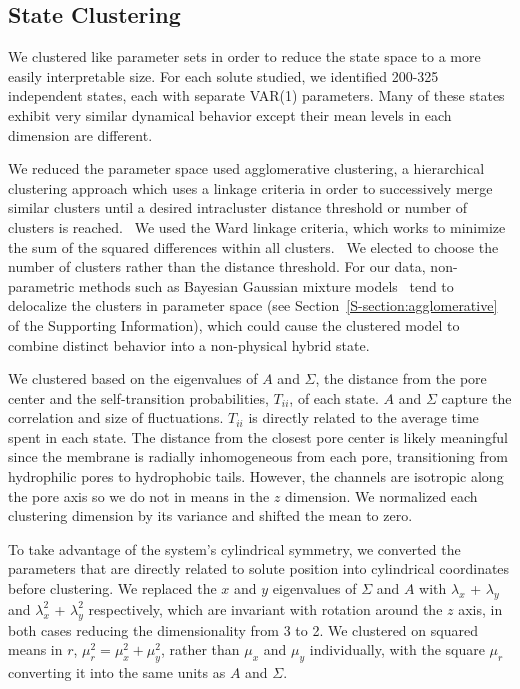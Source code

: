 \documentclass[journal=jpcbfk,manuscript=article]{achemso}
\begin{document}
  \subsection{State Clustering}\label{method:clustering}  

  We clustered like parameter sets in order to reduce the state space to
  a more easily interpretable size. For each solute studied, we identified 200-325
  independent states, each with separate VAR(1) parameters. Many of these states
  exhibit very similar dynamical behavior except their mean levels in each dimension
  are different.
  
  We reduced the parameter space used agglomerative clustering, a hierarchical
  clustering approach which uses a linkage criteria in order to successively merge
  similar clusters until a desired intracluster distance threshold or number of
  clusters is reached.~\cite{pedregosa_scikit-learn_2011} We used the Ward linkage 
  criteria, which works to minimize the sum of the squared differences within all
  clusters.~\cite{ward_hierarchical_1963} We elected to choose the number of clusters
  rather than the distance threshold. For our data, non-parametric methods such as 
  Bayesian Gaussian mixture models~\cite{pedregosa_scikit-learn_2011,gelman_bayesian_2013}
  tend to delocalize the clusters in parameter space (see Section~\ref{S-section:agglomerative}
  of the Supporting Information), which could cause the clustered model to combine 
  distinct behavior into a non-physical hybrid state.

  We clustered based on the eigenvalues of $A$ and $\Sigma$, the distance from the 
  pore center and the self-transition probabilities, $T_{ii}$, of each state. $A$ 
  and $\Sigma$ capture the correlation and size of fluctuations. $T_{ii}$ is directly
  related to the average time spent in each state. The distance from the closest pore 
  center is likely meaningful since the membrane is radially inhomogeneous from each 
  pore, transitioning from hydrophilic pores to hydrophobic tails. However, the 
  channels are isotropic along the pore axis so we do not in means in the $z$ dimension.
  We normalized each clustering dimension by its variance and shifted the mean to zero.
  
  To take advantage of the system's cylindrical symmetry, we converted the parameters that
  are directly related to solute position into cylindrical coordinates before clustering. 
  We replaced the $x$ and $y$ eigenvalues of $\Sigma$ and $A$ with $\lambda_x$ + 
  $\lambda_y$ and $\lambda_x^2$ + $\lambda_y^2$ respectively, which are invariant with 
  rotation around the $z$ axis, in both cases reducing the dimensionality from 3 to 2.  
  We clustered on squared means in $r$, $\mu_r^2 = \mu_x^2 + \mu_y^2$, rather than
  $\mu_x$ and $\mu_y$ individually, with the square $\mu_r$ converting it into the 
  same units as $A$ and $\Sigma$.
\end{document}
